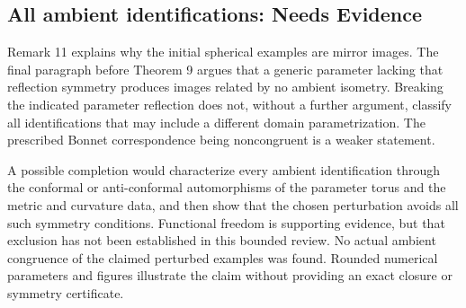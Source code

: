 \documentclass[10pt]{article}
\begin{document}
\subsection*{All ambient identifications: Needs Evidence}
Remark 11 explains why the initial spherical examples are mirror images. The final paragraph before Theorem 9 argues that a generic parameter lacking that reflection symmetry produces images related by no ambient isometry. Breaking the indicated parameter reflection does not, without a further argument, classify all identifications that may include a different domain parametrization. The prescribed Bonnet correspondence being noncongruent is a weaker statement.\par
A possible completion would characterize every ambient identification through the conformal or anti-conformal automorphisms of the parameter torus and the metric and curvature data, and then show that the chosen perturbation avoids all such symmetry conditions. Functional freedom is supporting evidence, but that exclusion has not been established in this bounded review. No actual ambient congruence of the claimed perturbed examples was found. Rounded numerical parameters and figures illustrate the claim without providing an exact closure or symmetry certificate.\par
\end{document}

